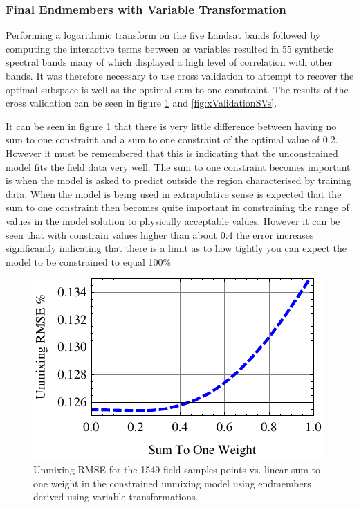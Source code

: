 \documentclass[remotesensing,article,accept,moreauthors,pdftex,12pt,a4paper]{mdpi}
\begin{document}
\subsubsection{Final Endmembers with Variable Transformation}

Performing a logarithmic transform on the five Landsat bands followed by computing the interactive terms between or variables resulted in 55 synthetic spectral bands many of which displayed a high level of correlation with other bands. It was therefore necessary to use cross validation to attempt to recover the optimal subspace is well as the optimal sum to one constraint. The results of the cross validation can be seen in figure \ref{fig:sum2oneNL} and \ref{fig:xValidationSVs}. 

It can be seen in figure \ref{fig:sum2oneNL} that there is very little difference between having no sum to one constraint and a sum to one constraint of the optimal value of 0.2. However it must be remembered that this is indicating that the unconstrained model fits the field data very well. The sum to one constraint becomes important is when the model is asked to predict outside the region characterised by training data. When the model is being used in extrapolative sense is expected that the sum to one constraint then becomes quite important in constraining the range of values in the model solution to physically acceptable values. However it can be seen that with constrain values higher than about 0.4 the error increases significantly indicating that there is a limit as to how tightly you can expect the model to be constrained to equal 100\%

\begin{figure} 

\includegraphics{sumToOnePlotNL.pdf}\caption{\label{fig:sum2oneNL}Unmixing RMSE for the 1549 field samples points vs. linear sum to one weight in the constrained unmixing model using endmembers derived using variable transformations.} 

 \end{figure} 
\end{document}
